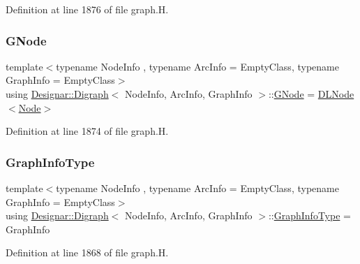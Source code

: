 Definition at line 1876 of file graph.\+H.

\mbox{\label{class_designar_1_1_digraph_a33b0d2b8820ada501522b0e67e63524a}} 
\subsubsection{\texorpdfstring{G\+Node}{GNode}}
{\footnotesize\ttfamily template$<$typename Node\+Info , typename Arc\+Info  = Empty\+Class, typename Graph\+Info  = Empty\+Class$>$ \\
using \hyperlink{class_designar_1_1_digraph}{Designar\+::\+Digraph}$<$ Node\+Info, Arc\+Info, Graph\+Info $>$\+::\hyperlink{class_designar_1_1_digraph_a33b0d2b8820ada501522b0e67e63524a}{G\+Node} =  \hyperlink{class_designar_1_1_d_l_node}{D\+L\+Node}$<$\hyperlink{class_designar_1_1_digraph_a4dc921c41a480b7946a04170e997d8ae}{Node}$>$\hspace{0.3cm}{\ttfamily [protected]}}



Definition at line 1874 of file graph.\+H.

\mbox{\label{class_designar_1_1_digraph_a2baffbb176ff86becd7452d2acc0ca74}} 
\subsubsection{\texorpdfstring{Graph\+Info\+Type}{GraphInfoType}}
{\footnotesize\ttfamily template$<$typename Node\+Info , typename Arc\+Info  = Empty\+Class, typename Graph\+Info  = Empty\+Class$>$ \\
using \hyperlink{class_designar_1_1_digraph}{Designar\+::\+Digraph}$<$ Node\+Info, Arc\+Info, Graph\+Info $>$\+::\hyperlink{class_designar_1_1_digraph_a2baffbb176ff86becd7452d2acc0ca74}{Graph\+Info\+Type} =  Graph\+Info}



Definition at line 1868 of file graph.\+H.

\mbox{\label{class_designar_1_1_digraph_a4dc921c41a480b7946a04170e997d8ae}} 

